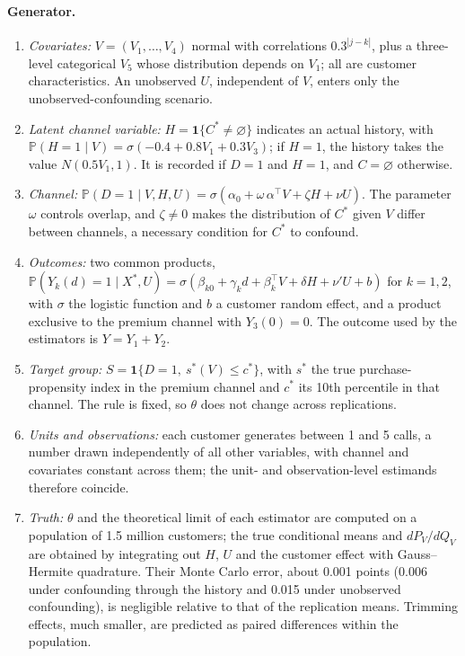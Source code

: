 \documentclass[11pt,a4paper]{article}
\newcommand{\PP}{\mathbb{P}}
\newcommand{\ind}{\mathbf{1}}
\newcommand{\vacio}{\varnothing}
\theoremstyle{plain}
\theoremstyle{definition}
\begin{document}
\paragraph{Generator.}
\begin{enumerate}
  \item \emph{Covariates:} $V=(V_1,\dots,V_4)$ normal with correlations $0.3^{|j-k|}$, plus a three-level categorical $V_5$ whose distribution depends on $V_1$; all are customer characteristics. An unobserved $U$, independent of $V$, enters only the unobserved-confounding scenario.
  \item \emph{Latent channel variable:} $H=\ind\{C^*\ne\vacio\}$ indicates an actual history, with $\PP(H=1\mid V)=\sigma(-0.4+0.8V_1+0.3V_3)$; if $H=1$, the history takes the value $N(0.5V_1,1)$. It is recorded if $D=1$ and $H=1$, and $C=\vacio$ otherwise.
  \item \emph{Channel:} $\PP(D=1\mid V,H,U)=\sigma(\alpha_0+\omega\,\alpha^\top V+\zeta H+\nu U)$. The parameter $\omega$ controls overlap, and $\zeta\ne0$ makes the distribution of $C^*$ given $V$ differ between channels, a necessary condition for $C^*$ to confound.
  \item \emph{Outcomes:} two common products, $\PP(Y_k(d)=1\mid X^*,U)=\sigma(\beta_{k0}+\gamma_k d+\beta_k^\top V+\delta H+\nu'U+b)$ for $k=1,2$, with $\sigma$ the logistic function and $b$ a customer random effect, and a product exclusive to the premium channel with $Y_3(0)=0$. The outcome used by the estimators is $Y=Y_1+Y_2$.
  \item \emph{Target group:} $S=\ind\{D=1,\ s^*(V)\le c^*\}$, with $s^*$ the true purchase-propensity index in the premium channel and $c^*$ its 10th percentile in that channel. The rule is fixed, so $\theta$ does not change across replications.
  \item \emph{Units and observations:} each customer generates between 1 and 5 calls, a number drawn independently of all other variables, with channel and covariates constant across them; the unit- and observation-level estimands therefore coincide.
  \item \emph{Truth:} $\theta$ and the theoretical limit of each estimator are computed on a population of 1.5 million customers; the true conditional means and $dP_V/dQ_V$ are obtained by integrating out $H$, $U$ and the customer effect with Gauss--Hermite quadrature. Their Monte Carlo error, about 0.001 points (0.006 under confounding through the history and 0.015 under unobserved confounding), is negligible relative to that of the replication means. Trimming effects, much smaller, are predicted as paired differences within the population.
\end{enumerate}
\end{document}
